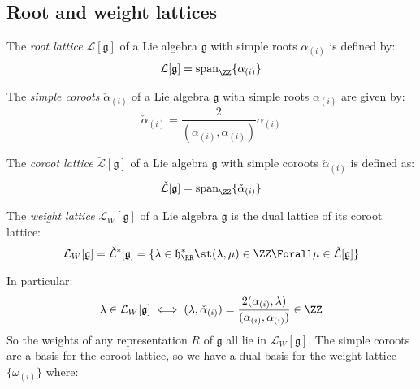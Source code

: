 \documentclass{jknotes}
\begin{document}
\subsection{Root and weight lattices}
\begin{defn}
    The \emph{root lattice} \(\mathcal{L}[\mathfrak{g}]\) of a Lie algebra \(\mathfrak{g}\) with simple roots \(\alpha_{(i)}\) is defined by:
    \begin{equation}
        \mathcal{L}[\mathfrak{g}] = \operatorname{span}_\ZZ\{\alpha_{(i)}\}
    \end{equation}
\end{defn}
\begin{defn}
    The \emph{simple coroots} \(\check{\alpha}_{(i)}\) of a Lie algebra \(\mathfrak{g}\) with simple roots \(\alpha_{(i)}\) are given by:
    \begin{equation}
        \check{\alpha}_{(i)} = \frac{2}{(\alpha_{(i)},\alpha_{(i)})}\alpha_{(i)}
    \end{equation}
\end{defn}
\begin{defn}
    The \emph{coroot lattice} \(\check{\mathcal{L}}[\mathfrak{g}]\) of a Lie algebra \(\mathfrak{g}\) with simple coroots \(\check{\alpha}_{(i)}\) is defined as:
    \begin{equation}
        \check{\mathcal{L}}[\mathfrak{g}] = \operatorname{span}_\ZZ \{\check{\alpha}_{(i)}\}
    \end{equation}
\end{defn}
\begin{defn}
    The \emph{weight lattice} \(\mathcal{L}_W[\mathfrak{g}]\) of a Lie algebra \(\mathfrak{g}\) is the dual lattice of its coroot lattice:
    \begin{equation}
        \mathcal{L}_W[\mathfrak{g}] = \check{\mathcal{L}}^*[\mathfrak{g}] = \{\lambda \in \mathfrak{h}^*_\RR \st (\lambda,\mu) \in \ZZ \Forall \mu \in \check{\mathcal{L}}[\mathfrak{g}]\}
    \end{equation}
\end{defn}
In particular:
\begin{equation}
    \lambda \in \mathcal{L}_W[\mathfrak{g}] \iff (\lambda,\check{\alpha}_{(i)}) = \frac{2(\alpha_{(i)},\lambda)}{(\alpha_{(i)},\alpha_{(i)})} \in \ZZ
\end{equation}
So the weights of any representation \(R\) of \(\mathfrak{g}\) all lie in \(\mathcal{L}_W[\mathfrak{g}]\). The simple coroots are a basis for the coroot lattice, so we have a dual basis for the weight lattice \(\{\omega_{(i)}\}\) where:
\end{document}
